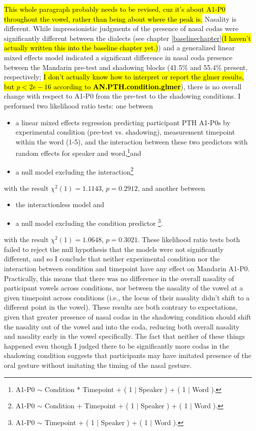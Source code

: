 \hl{This whole paragraph probably needs to be revised, cuz it's about A1-P0 throughout the vowel, rather than being about where the peak is.} Nasality is different. While impressionistic judgments of the presence of nasal codas were significantly different between the dialects (see chapter \ref{baselinechapter}\hl{(I haven't actually written this into the baseline chapter yet.)}) and a generalized linear mixed effects model indicated a significant difference in nasal coda presence between the Mandarin pre-test and shadowing blocks (41.5\% and 55.4\% present, respectively; \hl{I don't actually know how to interpret or report the glmer results, but $p < 2e-16$ according to \textbf{AN.PTH.condition.glmer}}), there is no overall change with respect to A1-P0 from the pre-test to the shadowing conditions. I performed two likelihood ratio tests: one between
\begin{itemize}
    \item a linear mixed effects regression predicting participant PTH A1-P0s by experimental condition (pre-test vs. shadowing), measurement timepoint within the word (1-5), and the interaction between these two predictors with random effects for speaker and word,\footnote{A1-P0 $\sim$ Condition * Timepoint + ( 1 $|$ Speaker ) + ( 1 $|$ Word ). %
    }and
    \item a null model excluding the interaction\footnote{A1-P0 $\sim$ Condition + Timepoint + ( 1 $|$ Speaker ) + ( 1 $|$ Word ).}
\end{itemize}
with the result $\chi^2(1) = 1.1143$, $p = 0.2912$, and another between
  \begin{itemize}
    \item the interactionless model and
    \item a null model excluding the condition predictor \footnote{A1-P0 $\sim$ Timepoint + ( 1 $|$ Speaker ) + ( 1 $|$ Word ).}.
\end{itemize}
with the result $\chi^2(1) = 1.0648$, $p = 0.3021$.
These likelihood ratio tests both failed to reject the null hypothesis that the models were not significantly different, and so I conclude that neither experimental condition nor the interaction between condition and timepoint have any effect on Mandarin A1-P0. Practically, this means that there was no difference in the overall nasality of participant vowels across conditions, nor between the nasality of the vowel at a given timepoint across conditions (i.e., the locus of their nasality didn't shift to a different point in the vowel). These results are both contrary to expectations, given that greater presence of nasal codas in the shadowing condition should shift the nasality out of the vowel and into the coda, reducing both overall nasality and nasality early in the vowel specifically. The fact that neither of these things happened even though I judged there to be significantly more codas in the shadowing condition suggests that participants may have imitated presence of the oral gesture without imitating the timing of the nasal gesture.

